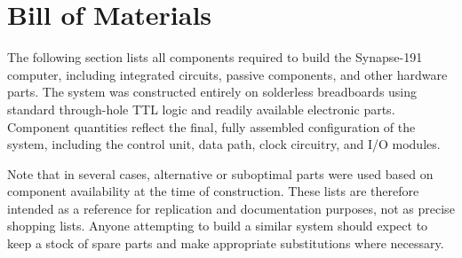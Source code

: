 \chapter{Bill of Materials} \label{sec:bom}
The following section lists all components required to build the Synapse-191 computer, including
integrated circuits, passive components, and other hardware parts.  
The system was constructed entirely on solderless breadboards using standard through-hole
TTL logic and readily available electronic parts.  
Component quantities reflect the final, fully assembled configuration of the system,
including the control unit, data path, clock circuitry, and I/O modules.

Note that in several cases, alternative or suboptimal parts were used based on component
availability at the time of construction.  
These lists are therefore intended as a reference for replication and documentation purposes,
not as precise shopping lists.  
Anyone attempting to build a similar system should expect to keep a stock of spare parts and
make appropriate substitutions where necessary.

